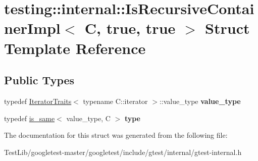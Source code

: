 \hypertarget{structtesting_1_1internal_1_1IsRecursiveContainerImpl_3_01C_00_01true_00_01true_01_4}{}\section{testing\+:\+:internal\+:\+:Is\+Recursive\+Container\+Impl$<$ C, true, true $>$ Struct Template Reference}
\label{structtesting_1_1internal_1_1IsRecursiveContainerImpl_3_01C_00_01true_00_01true_01_4}
\subsection*{Public Types}
\begin{DoxyCompactItemize}
\item 
\mbox{\label{structtesting_1_1internal_1_1IsRecursiveContainerImpl_3_01C_00_01true_00_01true_01_4_a8bbf5f5dec769e84b6f5a2e1fdb503e8}} 
typedef \hyperlink{structtesting_1_1internal_1_1IteratorTraits}{Iterator\+Traits}$<$ typename C\+::iterator $>$\+::value\+\_\+type {\bfseries value\+\_\+type}
\item 
\mbox{\label{structtesting_1_1internal_1_1IsRecursiveContainerImpl_3_01C_00_01true_00_01true_01_4_a6bf4fa07dd1c22c5d0ca4ed99c546e9c}} 
typedef \hyperlink{structtesting_1_1internal_1_1is__same}{is\+\_\+same}$<$ value\+\_\+type, C $>$ {\bfseries type}
\end{DoxyCompactItemize}


The documentation for this struct was generated from the following file\+:\begin{DoxyCompactItemize}
\item 
Test\+Lib/googletest-\/master/googletest/include/gtest/internal/gtest-\/internal.\+h\end{DoxyCompactItemize}
